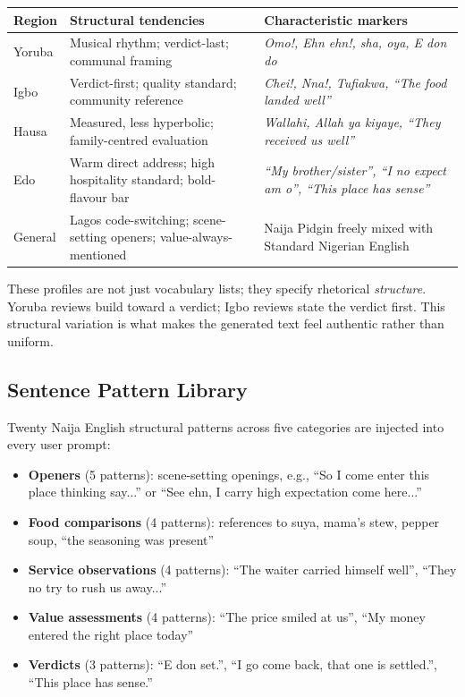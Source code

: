 \documentclass[11pt]{article}
\begin{document}
\begin{table}[h]
\centering
\begin{tabularx}{\textwidth}{lXX}
\toprule
\textbf{Region} & \textbf{Structural tendencies} & \textbf{Characteristic markers} \\
\midrule
Yoruba & Musical rhythm; verdict-last; communal framing & \textit{Omo!, Ehn ehn!, sha, oya, E don do} \\
Igbo & Verdict-first; quality standard; community reference & \textit{Chei!, Nna!, Tufiakwa, ``The food landed well''} \\
Hausa & Measured, less hyperbolic; family-centred evaluation & \textit{Wallahi, Allah ya kiyaye, ``They received us well''} \\
Edo & Warm direct address; high hospitality standard; bold-flavour bar & \textit{``My brother/sister'', ``I no expect am o'', ``This place has sense''} \\
General & Lagos code-switching; scene-setting openers; value-always-mentioned & Naija Pidgin freely mixed with Standard Nigerian English \\
\bottomrule
\end{tabularx}
\end{table}

These profiles are not just vocabulary lists; they specify rhetorical \textit{structure}. Yoruba reviews build toward a verdict; Igbo reviews state the verdict first. This structural variation is what makes the generated text feel authentic rather than uniform.

\subsection{Sentence Pattern Library}
\label{sec:patterns}

Twenty Naija English structural patterns across five categories are injected into every user prompt:
\begin{itemize}
    \item \textbf{Openers} (5 patterns): scene-setting openings, e.g., ``So I come enter this place thinking say...'' or ``See ehn, I carry high expectation come here...''
    \item \textbf{Food comparisons} (4 patterns): references to suya, mama's stew, pepper soup, ``the seasoning was present''
    \item \textbf{Service observations} (4 patterns): ``The waiter carried himself well'', ``They no try to rush us away...''
    \item \textbf{Value assessments} (4 patterns): ``The price smiled at us'', ``My money entered the right place today''
    \item \textbf{Verdicts} (3 patterns): ``E don set.'', ``I go come back, that one is settled.'', ``This place has sense.''
\end{itemize}
\end{document}
